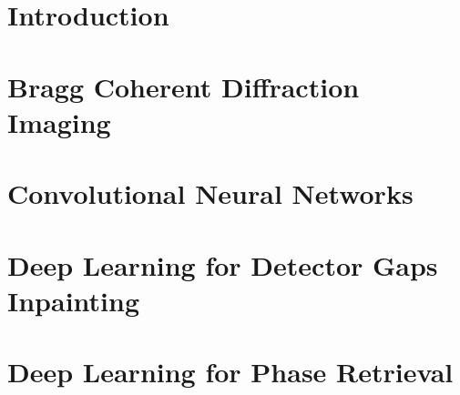 \documentclass[12pt]{book}
\begin{document}
\mainmatter



\fancyhead[RO]{\leftmark}
\fancyhead[LE]{\textsc{\chaptername~\thechapter}}

\chapter{Introduction}
\label{chap:introduction}


\chapter{Bragg Coherent Diffraction Imaging}
\label{chap:bcdi}


\chapter{Convolutional Neural Networks}
\label{chap:dl_theory}


\chapter{Deep Learning for Detector Gaps Inpainting}
\label{chap:inpainting}


\chapter{Deep Learning for Phase Retrieval}
\label{chap:phase_retrieval}


% 
\end{document}
